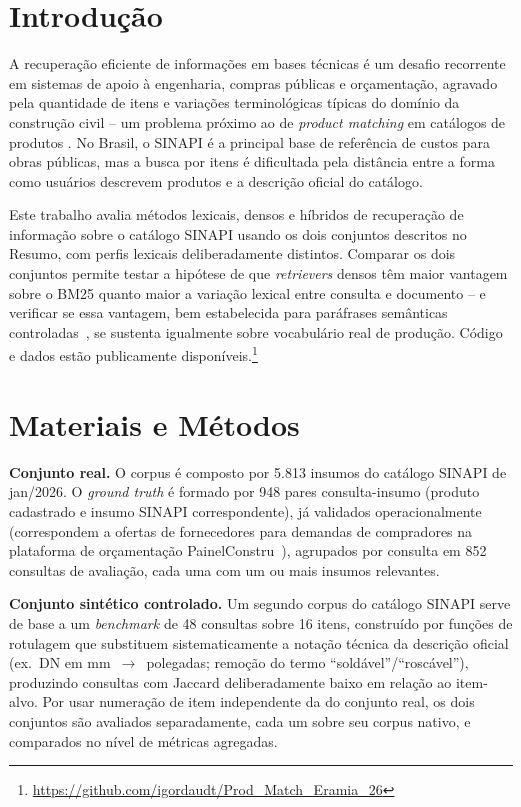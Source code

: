 \documentclass[12pt]{article}
\begin{document}
\section{Introdu\c{c}\~ao}

A recupera\c{c}\~ao eficiente de informa\c{c}\~oes em bases t\'ecnicas \'e um desafio recorrente em sistemas de apoio \`a engenharia, compras p\'ublicas e or\c{c}amenta\c{c}\~ao, agravado pela quantidade de itens e varia\c{c}\~oes terminol\'ogicas t\'ipicas do dom\'inio da constru\c{c}\~ao civil -- um problema pr\'oximo ao de \emph{product matching} em cat\'alogos de produtos \cite{peeters:20}. No Brasil, o SINAPI \'e a principal base de refer\^encia de custos para obras p\'ublicas, mas a busca por itens \'e dificultada pela dist\^ancia entre a forma como usu\'arios descrevem produtos e a descri\c{c}\~ao oficial do cat\'alogo.

Este trabalho avalia m\'etodos lexicais, densos e h\'ibridos de recupera\c{c}\~ao de informa\c{c}\~ao sobre o cat\'alogo SINAPI usando os dois conjuntos descritos no Resumo, com perfis lexicais deliberadamente distintos. Comparar os dois conjuntos permite testar a hip\'otese de que \emph{retrievers} densos t\^em maior vantagem sobre o BM25 quanto maior a varia\c{c}\~ao lexical entre consulta e documento -- e verificar se essa vantagem, bem estabelecida para par\'afrases sem\^anticas controladas~\cite{karpukhin:20}, se sustenta igualmente sobre vocabul\'ario real de produ\c{c}\~ao. C\'odigo e dados est\~ao publicamente dispon\'iveis.\footnote{\url{https://github.com/igordaudt/Prod_Match_Eramia_26}}

\section{Materiais e M\'etodos}

\textbf{Conjunto real.} O corpus \'e composto por 5.813 insumos do cat\'alogo SINAPI de jan/2026. O \emph{ground truth} \'e formado por 948 pares consulta-insumo (produto cadastrado e insumo SINAPI correspondente), j\'a validados operacionalmente (correspondem a ofertas de fornecedores para demandas de compradores na plataforma de or\c{c}amenta\c{c}\~ao PainelConstru~\cite{painelconstru:26}), agrupados por consulta em 852 consultas de avalia\c{c}\~ao, cada uma com um ou mais insumos relevantes.

\textbf{Conjunto sint\'etico controlado.} Um segundo corpus do cat\'alogo SINAPI serve de base a um \emph{benchmark} de 48 consultas sobre 16 itens, constru\'ido por fun\c{c}\~oes de rotulagem que substituem sistematicamente a nota\c{c}\~ao t\'ecnica da descri\c{c}\~ao oficial (ex.\ DN em mm~$\rightarrow$~polegadas; remo\c{c}\~ao do termo ``sold\'avel''/``rosc\'avel''), produzindo consultas com Jaccard deliberadamente baixo em rela\c{c}\~ao ao item-alvo. Por usar numera\c{c}\~ao de item independente da do conjunto real, os dois conjuntos s\~ao avaliados separadamente, cada um sobre seu corpus nativo, e comparados no n\'ivel de m\'etricas agregadas.
\end{document}
